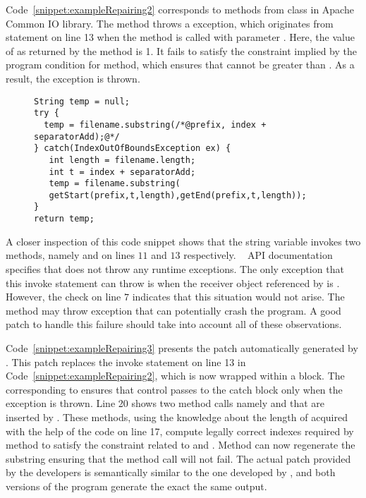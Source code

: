 Code~\ref{snippet:exampleRepairing2} corresponds to methods from
 class in Apache Common IO library. The method
 throws a  exception,
which originates from statement  on line 13 when the method is called with parameter
.  Here, the value of  as returned by the method
 is 1. It fails to satisfy the constraint implied by the
program condition  for 
method, which ensures that  cannot be greater than
. As a result, the exception is thrown.


\begin{figure}[t]
\centering
\begin{lstlisting}
String temp = null;
try {
  temp = filename.substring(/*@prefix, index + separatorAdd);@*/
} catch(IndexOutOfBoundsException ex) {
   int length = filename.length;
   int t = index + separatorAdd;
   temp = filename.substring(
   getStart(prefix,t,length),getEnd(prefix,t,length));
}
return temp;
\end{lstlisting}
\end{figure}

A closer inspection of this code snippet shows that the string variable
 invokes two methods, namely  and 
on lines $11$ and $13$ respectively. \java\  API documentation
specifies that  does not throw any runtime exceptions. The only
exception that this invoke statement can throw is when the receiver object
referenced by  is . However, the check on line $7$
indicates that this situation would not arise. The method  may
throw  exception that can potentially crash the
program. A good patch to handle this failure should take into account all of
these observations. 

Code~\ref{snippet:exampleRepairing3} presents the patch automatically generated
by \tool. This patch replaces the invoke statement on line 13 in
Code~\ref{snippet:exampleRepairing2}, which is now wrapped within a
 block. The  corresponding to
ensures that control passes
to the catch block only when the exception is thrown. Line 20 shows two method
calls namely  and  that are inserted by \tool. These
methods, using the knowledge about the length of  acquired with
the help of the code on line 17, compute legally correct indexes required by
 method to satisfy the constraint related to 
and . Method  can now regenerate the substring
ensuring that the method call will not fail. The actual patch provided by the
developers is semantically similar to the one developed by \tool, and both
versions of the program generate the exact the same output.

